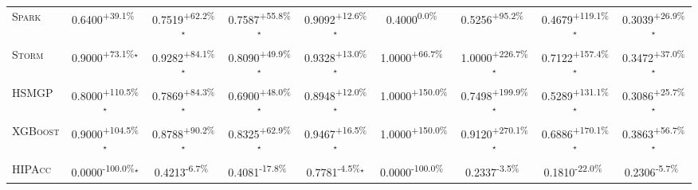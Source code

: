 \begin{table}[htbp]
\begin{tabular}{l|cccc|cccc}
\textsc{Spark} & \cellcolor{green!30}0.6400\textsuperscript{+39.1\%}$^{\,\,\,}$ & \cellcolor{green!30}0.7519\textsuperscript{+62.2\%}$^\star$ & \cellcolor{green!30}0.7587\textsuperscript{+55.8\%}$^\star$ & \cellcolor{green!30}0.9092\textsuperscript{+12.6\%}$^\star$ & \cellcolor{red!30}0.4000\textsuperscript{0.0\%}$^{\,\,\,}$ & \cellcolor{green!30}0.5256\textsuperscript{+95.2\%}$^{\,\,\,}$ & \cellcolor{green!30}0.4679\textsuperscript{+119.1\%}$^\star$ & \cellcolor{green!30}0.3039\textsuperscript{+26.9\%}$^\star$ \\
\textsc{Storm} & \cellcolor{green!30}0.9000\textsuperscript{+73.1\%}$^\star$ & \cellcolor{green!30}0.9282\textsuperscript{+84.1\%}$^\star$ & \cellcolor{green!30}0.8090\textsuperscript{+49.9\%}$^\star$ & \cellcolor{green!30}0.9328\textsuperscript{+13.0\%}$^\star$ & \cellcolor{green!30}1.0000\textsuperscript{+66.7\%}$^{\,\,\,}$ & \cellcolor{green!30}1.0000\textsuperscript{+226.7\%}$^\star$ & \cellcolor{green!30}0.7122\textsuperscript{+157.4\%}$^\star$ & \cellcolor{green!30}0.3472\textsuperscript{+37.0\%}$^\star$ \\
\textsc{HSMGP} & \cellcolor{green!30}0.8000\textsuperscript{+110.5\%}$^\star$ & \cellcolor{green!30}0.7869\textsuperscript{+84.3\%}$^\star$ & \cellcolor{green!30}0.6900\textsuperscript{+48.0\%}$^\star$ & \cellcolor{green!30}0.8948\textsuperscript{+12.0\%}$^\star$ & \cellcolor{green!30}1.0000\textsuperscript{+150.0\%}$^{\,\,\,}$ & \cellcolor{green!30}0.7498\textsuperscript{+199.9\%}$^\star$ & \cellcolor{green!30}0.5289\textsuperscript{+131.1\%}$^\star$ & \cellcolor{green!30}0.3086\textsuperscript{+25.7\%}$^\star$ \\
\textsc{XGBoost} & \cellcolor{green!30}0.9000\textsuperscript{+104.5\%}$^\star$ & \cellcolor{green!30}0.8788\textsuperscript{+90.2\%}$^\star$ & \cellcolor{green!30}0.8325\textsuperscript{+62.9\%}$^\star$ & \cellcolor{green!30}0.9467\textsuperscript{+16.5\%}$^\star$ & \cellcolor{green!30}1.0000\textsuperscript{+150.0\%}$^{\,\,\,}$ & \cellcolor{green!30}0.9120\textsuperscript{+270.1\%}$^\star$ & \cellcolor{green!30}0.6886\textsuperscript{+170.1\%}$^\star$ & \cellcolor{green!30}0.3863\textsuperscript{+56.7\%}$^\star$ \\
\textsc{HIPAcc} & \cellcolor{red!30}0.0000\textsuperscript{-100.0\%}$^\star$ & \cellcolor{red!30}0.4213\textsuperscript{-6.7\%}$^{\,\,\,}$ & \cellcolor{red!30}0.4081\textsuperscript{-17.8\%}$^{\,\,\,}$ & \cellcolor{red!30}0.7781\textsuperscript{-4.5\%}$^\star$ & \cellcolor{red!30}0.0000\textsuperscript{-100.0\%}$^{\,\,\,}$ & \cellcolor{red!30}0.2337\textsuperscript{-3.5\%}$^{\,\,\,}$ & \cellcolor{red!30}0.1810\textsuperscript{-22.0\%}$^{\,\,\,}$ & \cellcolor{red!30}0.2306\textsuperscript{-5.7\%}$^{\,\,\,}$ \\

\end{tabular}
\end{table}
